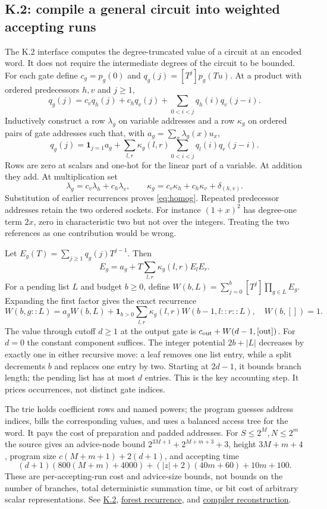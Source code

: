 \documentclass[11pt,letterpaper]{article}
\theoremstyle{definition}\newtheorem{definition}[theorem]{Definition}\newtheorem{example}[theorem]{Example}
\theoremstyle{remark}\newtheorem{remark}[theorem]{Remark}
\newcommand{\ind}[1]{\mathbf{1}_{#1}}
\newcommand{\pub}[3]{\href{https://github.com/anthropics/formal-math/blob/11b6c7e3c927df2658f513b6b68ea7f8929c62c5/vp-vnp/#1\#L#2}{#3}}
\newcommand{\aud}[2]{\href{https://github.com/nousentllc/VP-VNP-Review/blob/567303d0bcf4f9d54390437b137752446e58ccd6/#1}{#2}}
\begin{document}
\subsection{K.2: compile a general circuit into weighted accepting runs}\label{sec:compiler}
The K.2 interface computes the degree-truncated value of a circuit at an encoded word. It does not require the intermediate degrees of the circuit to be bounded. For each gate define $c_g=p_g(0)$ and $q_g(j)=[T^j]p_g(Tu)$. At a product with ordered predecessors $h,v$ and $j\ge1$,
\[
 q_g(j)=c_vq_h(j)+c_hq_v(j)+\sum_{0<i<j}q_h(i)q_v(j-i).
\]
Inductively construct a row $\lambda_g$ on variable addresses and a row $\kappa_g$ on ordered pairs of gate addresses such that, with $a_g=\sum_x\lambda_g(x)u_x$,
\begin{equation}\label{eq:homog}
 q_g(j)=\ind{j=1}a_g+\sum_{l,r}\kappa_g(l,r)\sum_{0<i<j}q_l(i)q_r(j-i).
\end{equation}
Rows are zero at scalars and one-hot for the linear part of a variable. At addition they add. At multiplication set
\[
 \lambda_g=c_v\lambda_h+c_h\lambda_v,\qquad
 \kappa_g=c_v\kappa_h+c_h\kappa_v+\delta_{(h,v)}.
\]
Substitution of earlier recurrences proves \eqref{eq:homog}. Repeated predecessor addresses retain the two ordered sockets. For instance $(1+x)^2$ has degree-one term $2x$, zero in characteristic two but not over the integers. Treating the two references as one contribution would be wrong.

Let $E_g(T)=\sum_{j\ge1}q_g(j)T^{j-1}$. Then
\[
 E_g=a_g+T\sum_{l,r}\kappa_g(l,r)E_lE_r.
\]
For a pending list $L$ and budget $b\ge0$, define $W(b,L)=\sum_{j=0}^b[T^j]\prod_{g\in L}E_g$. Expanding the first factor gives the exact recurrence
\begin{equation}\label{eq:forest}
 W(b,g::L)=a_gW(b,L)+\ind{b>0}\sum_{l,r}\kappa_g(l,r)W(b-1,l::r::L),\quad W(b,[])=1.
\end{equation}
The value through cutoff $d\ge1$ at the output gate is $c_{\rm out}+W(d-1,[\rm out])$. For $d=0$ the constant component suffices. The integer potential $2b+|L|$ decreases by exactly one in either recursive move: a leaf removes one list entry, while a split decrements $b$ and replaces one entry by two. Starting at $2d-1$, it bounds branch length; the pending list has at most $d$ entries. This is the key accounting step. It prices occurrences, not distinct gate indices.

The trie holds coefficient rows and named powers; the program guesses address indices, bills the corresponding values, and uses a balanced access tree for the word. It pays the cost of preparation and padded addresses. For $S\le2^M,N\le2^m$ the source gives an advice-node bound $2^{3M+1}+2^{M+m+3}+3$, height $3M+m+4$, program size $c(M+m+1)+2(d+1)$, and accepting time
\[
 (d+1)(800(M+m)+4000)+(|z|+2)(40m+60)+10m+100.
\]
These are per-accepting-run cost and advice-size bounds, not bounds on the number of branches, total deterministic summation time, or bit cost of arbitrary scalar representations. See \pub{Paper/LowDeg.lean}{42}{K.2}, \pub{Nc/Acc/Loop.lean}{182}{forest recurrence}, and \aud{passes/14c-compiler.md}{compiler reconstruction}.
\end{document}
